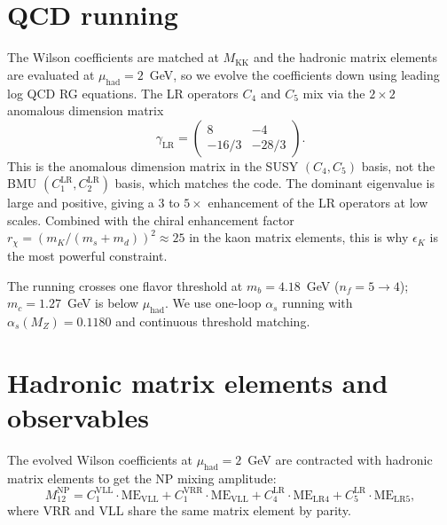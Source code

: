 \documentclass[11pt]{article}
\newcommand{\Mkk}{M_{\mathrm{KK}}}
\begin{document}
\section{QCD running}

The Wilson coefficients are matched at $\Mkk$ and the hadronic
matrix elements are evaluated at $\mu_{\mathrm{had}} = 2$~GeV, so we evolve
the coefficients down using leading log QCD RG equations. The LR
operators $C_4$ and $C_5$ mix via the $2\times2$ anomalous dimension matrix
\begin{equation}
  \gamma_{\mathrm{LR}} = \begin{pmatrix} 8 & -4 \\ -16/3 & -28/3 \end{pmatrix}.
\end{equation}
This is the anomalous dimension matrix
in the SUSY $(C_4, C_5)$ basis, not the BMU $(C_1^{\mathrm{LR}},
C_2^{\mathrm{LR}})$ basis, which matches the code. 
The dominant eigenvalue is large and positive, giving a $3$ to $5\times$
enhancement of the LR operators at low scales. Combined with the chiral
enhancement factor $r_\chi = (m_K/(m_s + m_d))^2 \approx 25$ in the kaon
matrix elements, this is why $\epsilon_K$ is the most powerful constraint.

The running crosses one flavor threshold at $m_b = 4.18$~GeV ($n_f = 5 \to 4$);
$m_c = 1.27$~GeV is below $\mu_{\mathrm{had}}$. We use one-loop $\alpha_s$
running with $\alpha_s(M_Z) = 0.1180$ and continuous threshold matching.


\section{Hadronic matrix elements and observables}

The evolved Wilson coefficients at $\mu_{\mathrm{had}} = 2$~GeV are
contracted with hadronic matrix elements to get the NP mixing amplitude:
\begin{equation}
  M_{12}^{\mathrm{NP}} = C_1^{\mathrm{VLL}} \cdot \mathrm{ME}_{\mathrm{VLL}}
    + C_1^{\mathrm{VRR}} \cdot \mathrm{ME}_{\mathrm{VLL}}
    + C_4^{\mathrm{LR}} \cdot \mathrm{ME}_{\mathrm{LR4}}
    + C_5^{\mathrm{LR}} \cdot \mathrm{ME}_{\mathrm{LR5}},
\end{equation}
where VRR and VLL share the same matrix element by parity. 
\end{document}
